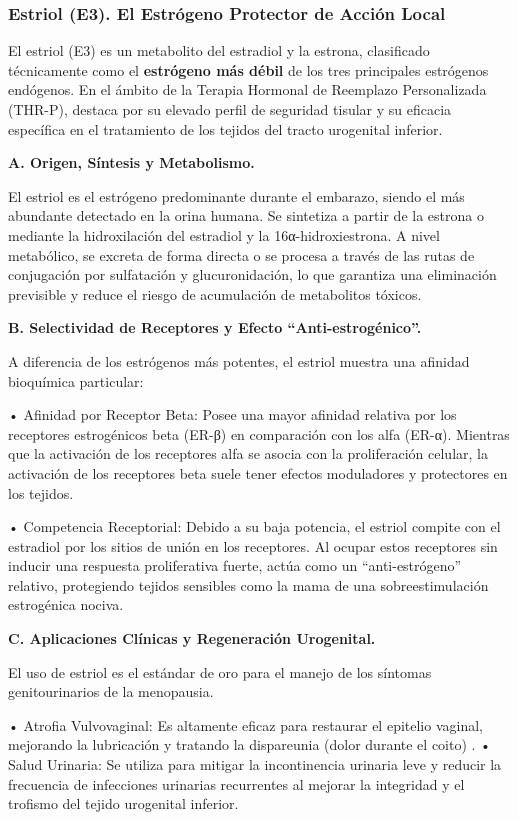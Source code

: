 \documentclass[
  spanish,
]{article}
\begin{document}
\subsubsection{Estriol (E3). El Estrógeno Protector de Acción Local}\label{estriol-e3.-el-estruxf3geno-protector-de-acciuxf3n-local}

El estriol (E3) es un metabolito del estradiol y la estrona, clasificado técnicamente como el \textbf{estrógeno más débil} de los tres principales estrógenos endógenos. En el ámbito de la Terapia Hormonal de Reemplazo Personalizada (THR-P), destaca por su elevado perfil de seguridad tisular y su eficacia específica en el tratamiento de los tejidos del tracto urogenital inferior.

\textbf{A. Origen, Síntesis y Metabolismo.}

El estriol es el estrógeno predominante durante el embarazo, siendo el más abundante detectado en la orina humana. Se sintetiza a partir de la estrona o mediante la hidroxilación del estradiol y la 16α-hidroxiestrona. A nivel metabólico, se excreta de forma directa o se procesa a través de las rutas de conjugación por sulfatación y glucuronidación, lo que garantiza una eliminación previsible y reduce el riesgo de acumulación de metabolitos tóxicos.

\textbf{B. Selectividad de Receptores y Efecto ``Anti-estrogénico''.}

A diferencia de los estrógenos más potentes, el estriol muestra una afinidad bioquímica particular:

• Afinidad por Receptor Beta: Posee una mayor afinidad relativa por los receptores estrogénicos beta (ER-β) en comparación con los alfa (ER-α). Mientras que la activación de los receptores alfa se asocia con la proliferación celular, la activación de los receptores beta suele tener efectos moduladores y protectores en los tejidos.

• Competencia Receptorial: Debido a su baja potencia, el estriol compite con el estradiol por los sitios de unión en los receptores. Al ocupar estos receptores sin inducir una respuesta proliferativa fuerte, actúa como un ``anti-estrógeno'' relativo, protegiendo tejidos sensibles como la mama de una sobreestimulación estrogénica nociva.

\textbf{C. Aplicaciones Clínicas y Regeneración Urogenital.}

El uso de estriol es el estándar de oro para el manejo de los síntomas genitourinarios de la menopausia.

• Atrofia Vulvovaginal: Es altamente eficaz para restaurar el epitelio vaginal, mejorando la lubricación y tratando la dispareunia (dolor durante el coito)
.
• Salud Urinaria: Se utiliza para mitigar la incontinencia urinaria leve y reducir la frecuencia de infecciones urinarias recurrentes al mejorar la integridad y el trofismo del tejido urogenital inferior.
\end{document}
